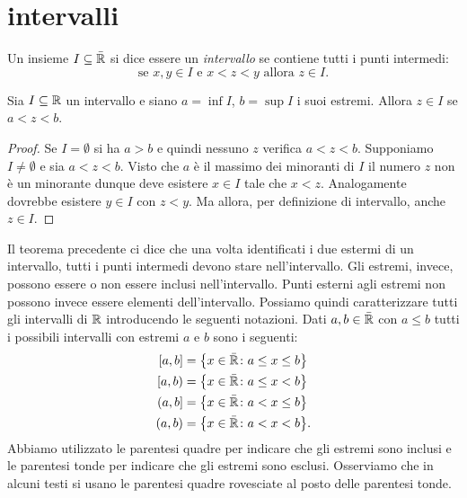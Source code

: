 \section{intervalli}

\begin{definition}[intervallo]
Un insieme $I\subseteq \bar{\mathbb R}$ si dice essere un \emph{intervallo}
se contiene tutti i punti intermedi:
\[
  \text{se $x, y \in I$ e $x<z<y$ allora $z \in I$.}
\]
\end{definition}
%
\begin{theorem}
Sia $I\subseteq \mathbb R$ un intervallo e siano $a=\inf I$, $b=\sup I$
i suoi estremi. Allora
$z\in I$ se $a < z < b$.
\end{theorem}
%
\begin{proof}
Se $I=\emptyset$ si ha $a>b$ e quindi nessuno $z$ verifica $a<z<b$.
Supponiamo $I\neq \emptyset$ e
sia $a < z < b$.
Visto che $a$ è il massimo dei minoranti di $I$
il numero $z$ non è un minorante dunque
deve esistere $x \in I$ tale
che $x < z$. Analogamente dovrebbe esistere $y\in I$
con $z<y$.
Ma allora, per definizione di intervallo, anche $z\in I$.
\end{proof}

Il teorema precedente ci dice che una volta identificati i due estermi
di un intervallo, tutti i punti intermedi devono stare nell'intervallo.
Gli estremi, invece, possono essere o non essere inclusi nell'intervallo.
Punti esterni agli estremi non possono invece essere elementi dell'intervallo.
Possiamo quindi caratterizzare tutti gli intervalli di $\mathbb R$
introducendo le seguenti notazioni. Dati $a,b\in \bar {\mathbb R}$ con $a\le b$
tutti i possibili intervalli con estremi $a$ e $b$ sono i seguenti:
\begin{equation}\label{eq:499494}
\begin{aligned}
[a,b] &= \ENCLOSE{x\in \bar \RR\colon a \le x \le b} \\
[a,b) &= \ENCLOSE{x\in \bar \RR\colon a \le x < b} \\
(a,b] &= \ENCLOSE{x\in \bar \RR\colon a < x \le b}\\
(a,b) &= \ENCLOSE{x\in \bar \RR\colon a < x < b}.
\end{aligned}
\end{equation}
Abbiamo utilizzato le parentesi quadre per indicare che gli estremi
sono inclusi e le parentesi tonde per indicare che gli estremi sono esclusi.
Osserviamo che in alcuni testi si usano le parentesi quadre rovesciate al posto
delle parentesi tonde.

